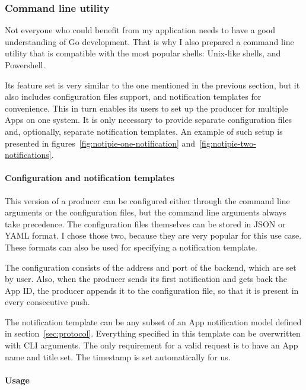 \subsubsection{Command line utility}\label{sec:command-line-utility}

Not everyone who could benefit
from my application
needs to have a good understanding
of Go development.
That is why I also prepared
a command line utility
that is compatible with the most popular shells:
Unix-like shells,
and Powershell.

Its feature set is very similar
to the one mentioned in the previous section,
but it also includes configuration files support,
and notification templates for convenience.
This in turn enables its users
to set up the producer for multiple Apps
on one system.
It is only necessary to provide
separate configuration files
and, optionally, separate notification templates.
An example of such setup is presented
in figures~\ref{fig:notipie-one-notification}
and~\ref{fig:notipie-two-notifications}.

\paragraph*{Configuration and notification templates}\label{sec:configuration-and-notification-templates}

This version of a producer can be configured
either through the command line arguments
or the configuration files,
but the command line arguments
always take precedence.
The configuration files themselves
can be stored in \ac{JSON} or \ac{YAML} format.
I chose those two,
because they are very popular
for this use case.
These formats can also be used
for specifying a notification template.

The configuration consists of
the address and port of the backend,
which are set by user.
Also, when the producer sends its first notification
and gets back the App \ac{ID},
the producer appends it to the configuration file,
so that it is present in every consecutive push.

The notification template can be any
subset of an App notification model
defined in section~\ref{sec:protocol}.
Everything specified in this template
can be overwritten with \ac{CLI} arguments.
The only requirement for a valid request
is to have an App name and title set.
The timestamp is set automatically for us.

\paragraph*{Usage}\label{sec:producer-usage}

